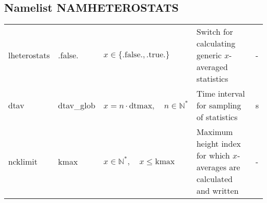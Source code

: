 \documentclass[twoside,11pt,fleqn,a4paper,english,openright]{report}
\begin{document}
\subsection{Namelist NAMHETEROSTATS}\label{par:namheterostats}
\begin{center}
  \tablelasttail{
        &&&&\\\hline
  }
\begin{supertabular}{|l|p{2cm}|p{4cm}|p{6cm}|l|}
  lheterostats		& .false.	& $x\in\{\text{.false.},\text{.true.}\}$	& Switch for calculating generic $x$-averaged statistics	& -\\
  dtav		& dtav\_glob	& $x = n \cdot \text{dtmax}, \quad n \in \mathbb{N}^*$	& Time interval for sampling of statistics	& s\\
  ncklimit& kmax &  $x \in \mathbb{N}^*, \quad x \le \text{kmax}$ & Maximum height index for which $x$-averages are calculated and written & -\\ 
\end{supertabular}
\end{center}

\end{document}
